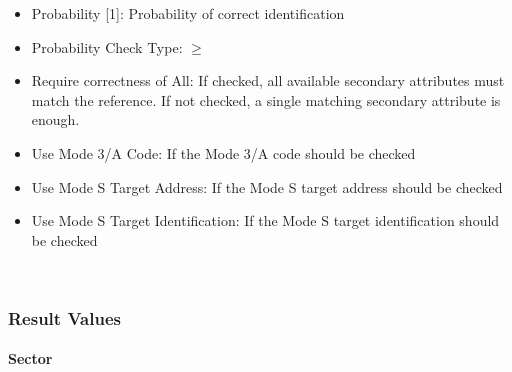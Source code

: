 \begin{itemize}  
\item Probability [1]: Probability of correct identification
\item Probability Check Type: $\geq$
\item Require correctness of All: If checked, all available secondary attributes must match the reference. If not checked, a single matching secondary attribute is enough.
\item Use Mode 3/A Code: If the Mode 3/A code should be checked
\item Use Mode S Target Address: If the Mode S target address should be checked
\item Use Mode S Target Identification: If the Mode S target identification should be checked
\end{itemize}
\ \\

\subsubsection{Result Values}

\paragraph{Sector}

